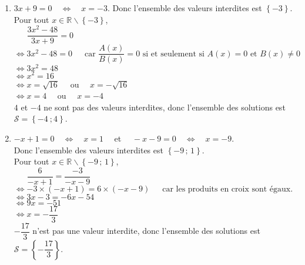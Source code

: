 \documentclass[a4paper,11pt,exos]{nsi} %
\begin{document}
\begin{enumerate}
    
           \item $3x+9=0 \quad\iff\quad x=-3$. 
           Donc l'ensemble des valeurs interdites est  $\left\{-3\right\}$.\\
           Pour tout $x\in \mathbb{R}\smallsetminus\left\{-3\right\}$, \\
            $\phantom{\iff} \dfrac{3x^2-48}{3x+9}=0$\\
            $\iff 3x^2-48=0\,\,\,\,\,\,\, \text{ car }\dfrac{A(x)}{B(x)}=0 \text { si et seulement si } A(x)=0 \text { et } B(x)\neq 0$\\
            $\iff 3x^2=48$\\
            $\iff x^2=16$\\
            $\iff x=\sqrt{16}\quad$ ou $\quad x=-\sqrt{16}$\\
            $\iff x=4\quad$ ou $\quad x=-4$\\
            $4$ et $-4$ ne sont pas des valeurs interdites, donc l'ensemble des solutions est  $\mathcal{S}=\left\{-4\ ; 4\right\}$.

            \item $-x+1=0 \quad\iff\quad x=1\quad$ et $\quad-x-9=0 \quad\iff\quad x=-9$. \\
            Donc l'ensemble des valeurs interdites est  $\left\{-9\,;\,1\right\}$. \\Pour tout $x\in \mathbb{R}\smallsetminus\left\{-9\,;\,1\right\}$,\\
    $\phantom{\iff}\dfrac{6}{-x+1}=\dfrac{-3}{-x-9}$\\
    $\iff -3\times (-x+1)=6\times (-x-9)\,\,\,\,\,\,\, \text{ car les produits en croix sont égaux.}$\\
    $\iff 3x-3=-6x-54$\\
    $\iff9x= -51$\\
    $\iff x=-\dfrac{17}{3}$\\ $-\dfrac{17}{3}$ n'est pas une valeur interdite, donc l'ensemble des solutions est  $\mathcal{S}=\left\{-\dfrac{17}{3}\right\}$.
  
\end{enumerate}
\end{document}
